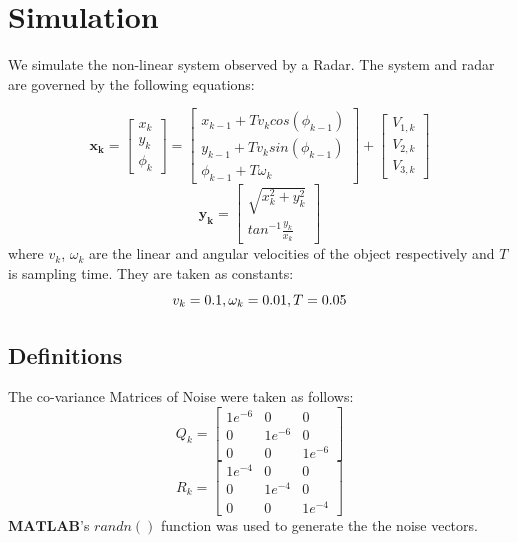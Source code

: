 \documentclass[a4paper,11pt]{article}
\theoremstyle{mytheor}
\begin{document}
\section*{Simulation}
We simulate the non-linear system observed by a Radar. The system and radar are governed by the following equations: 

\begin{equation}
    \boldsymbol{x_k} = 
    \begin{bmatrix}
    x_k\\
    y_k\\
    \phi_k
    \end{bmatrix} = 
    \begin{bmatrix}
    x_{k-1} + T v_k cos(\phi_{k-1}) \\
    y_{k-1} + T v_k sin(\phi_{k-1}) \\
    \phi_{k-1} + T\omega_k
    \end{bmatrix} + 
    \begin{bmatrix}
    V_{1, k}\\
    V_{2, k}\\
    V_{3, k}
    \end{bmatrix}
\end{equation}
\begin{equation}
    \boldsymbol{y_k} = 
    \begin{bmatrix}
    \sqrt{x_k^2+y_k^2}\\
    tan^{-1}\frac{y_k}{x_k}
    \end{bmatrix}
\end{equation}
where $v_k$, $\omega_k$ are the linear and angular velocities of the object respectively and $T$ is sampling time. They are taken as constants: 
\begin{equation*}
    v_k = 0.1, \\ \omega_k = 0.01, \\ T = 0.05
\end{equation*}
\subsection*{Definitions}
The co-variance Matrices of Noise were taken as follows: 
\begin{equation*}
    Q_k = 
    \begin{bmatrix}
    1e^{-6} & 0 & 0\\
    0 & 1e^{-6} & 0 \\
    0 & 0 & 1e^{-6}
    \end{bmatrix}
\end{equation*}
\begin{equation*}
    R_k = 
    \begin{bmatrix}
    1e^{-4} & 0 & 0\\
    0 & 1e^{-4} & 0 \\
    0 & 0 & 1e^{-4}
    \end{bmatrix}
\end{equation*}
$\mathbf{MATLAB}$'s $randn()$ function was used to generate the the noise vectors. 
\end{document}

